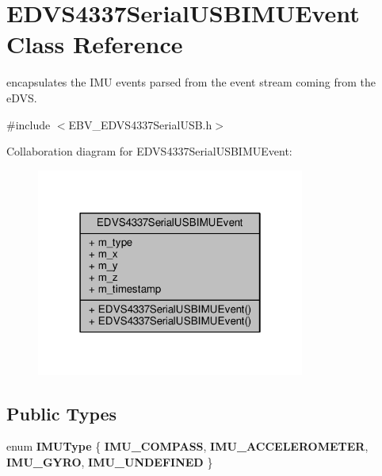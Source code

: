 \hypertarget{struct_e_d_v_s4337_serial_u_s_b_i_m_u_event}{}\section{E\+D\+V\+S4337\+Serial\+U\+S\+B\+I\+M\+U\+Event Class Reference}
\label{struct_e_d_v_s4337_serial_u_s_b_i_m_u_event}


encapsulates the I\+M\+U events parsed from the event stream coming from the e\+D\+V\+S.  




{\ttfamily \#include $<$E\+B\+V\+\_\+\+E\+D\+V\+S4337\+Serial\+U\+S\+B.\+h$>$}



Collaboration diagram for E\+D\+V\+S4337\+Serial\+U\+S\+B\+I\+M\+U\+Event\+:
\nopagebreak
\begin{figure}[H]
\begin{center}
\leavevmode
\includegraphics[width=250pt]{struct_e_d_v_s4337_serial_u_s_b_i_m_u_event__coll__graph}
\end{center}
\end{figure}
\subsection*{Public Types}
\begin{DoxyCompactItemize}
\item 
\hypertarget{struct_e_d_v_s4337_serial_u_s_b_i_m_u_event_a3c56f5e905756730da552d17d107455c}{}enum {\bfseries I\+M\+U\+Type} \{ {\bfseries I\+M\+U\+\_\+\+C\+O\+M\+P\+A\+S\+S}, 
{\bfseries I\+M\+U\+\_\+\+A\+C\+C\+E\+L\+E\+R\+O\+M\+E\+T\+E\+R}, 
{\bfseries I\+M\+U\+\_\+\+G\+Y\+R\+O}, 
{\bfseries I\+M\+U\+\_\+\+U\+N\+D\+E\+F\+I\+N\+E\+D}
 \}\label{struct_e_d_v_s4337_serial_u_s_b_i_m_u_event_a3c56f5e905756730da552d17d107455c}

\end{DoxyCompactItemize}
